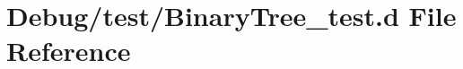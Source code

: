 \hypertarget{_binary_tree__test_8d}{}\section{Debug/test/\+Binary\+Tree\+\_\+test.d File Reference}
\label{_binary_tree__test_8d}
